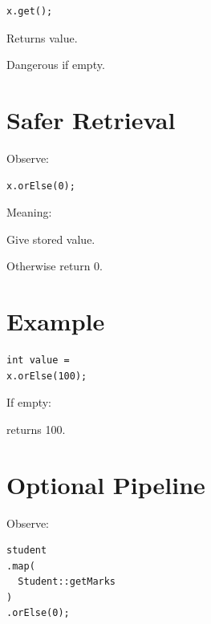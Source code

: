 \documentclass[11pt,a4paper]{book}
\begin{document}
\begin{verbatim} 
x.get();
\end{verbatim}


Returns value.


Dangerous if empty.


\section{Safer Retrieval}

Observe:

\begin{verbatim} 
x.orElse(0);
\end{verbatim}


Meaning:


Give stored value.

Otherwise return 0.


\section{Example}

\begin{verbatim} 
int value =
x.orElse(100);
\end{verbatim}


If empty:


returns 100.


\section{Optional Pipeline}

Observe:

\begin{verbatim} 
student
.map(
  Student::getMarks
)
.orElse(0);
\end{verbatim}
\end{document}
